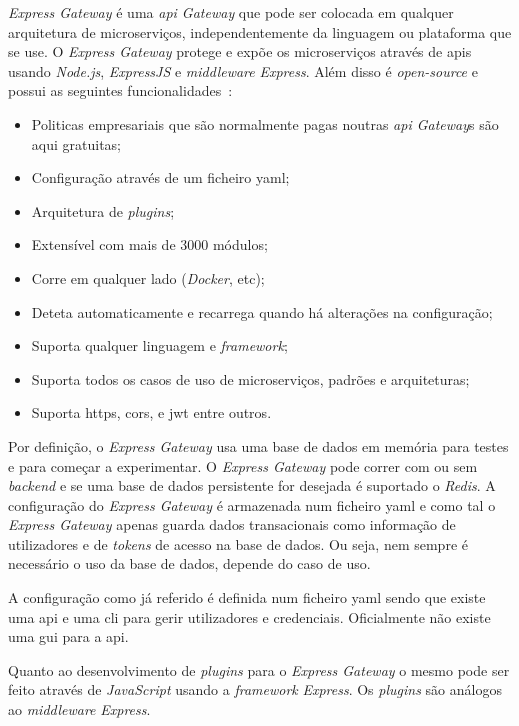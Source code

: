 \textit{Express Gateway} é uma \textit{\acrshort{api} Gateway} que pode ser colocada em qualquer arquitetura de microserviços, independentemente da linguagem ou plataforma que se use. O \textit{Express Gateway} protege e expõe os microserviços através de \acrshort{api}s usando \textit{Node.js}, \textit{ExpressJS} e \textit{middleware} \textit{Express}. Além disso é \textit{open-source} e possui as seguintes funcionalidades~\cite{kong}:
\begin{itemize}
    \item Politicas empresariais que são normalmente pagas noutras \textit{\acrshort{api} Gateway}s são aqui gratuitas;
    \item Configuração através de um ficheiro \acrshort{yaml};
    \item Arquitetura de \textit{plugins};
    \item Extensível com mais de 3000 módulos;
    \item Corre em qualquer lado (\textit{Docker}, etc);
    \item Deteta automaticamente e recarrega quando há alterações na configuração;
    \item Suporta qualquer linguagem e \textit{framework};
    \item Suporta todos os casos de uso de microserviços, padrões e arquiteturas;
    \item Suporta \acrshort{https}, \acrshort{cors}, e \acrshort{jwt} entre outros.
\end{itemize}

Por definição, o \textit{Express Gateway} usa uma base de dados em memória para testes e para começar a experimentar. O \textit{Express Gateway} pode correr com ou sem \textit{backend} e se uma base de dados persistente for desejada é suportado o \textit{Redis}. A configuração do \textit{Express Gateway} é armazenada num ficheiro \acrshort{yaml} e como tal o \textit{Express Gateway} apenas guarda dados transacionais como informação de utilizadores e de \textit{tokens} de acesso na base de dados. Ou seja, nem sempre é necessário o uso da base de dados, depende do caso de uso.

A configuração como já referido é definida num ficheiro \acrshort{yaml} sendo que existe uma \acrshort{api} e uma \acrshort{cli} para gerir utilizadores e credenciais. Oficialmente não existe uma \acrshort{gui} para a \acrshort{api}.

Quanto ao desenvolvimento de \textit{plugins} para o \textit{Express Gateway} o mesmo pode ser feito através de \textit{JavaScript} usando a \textit{framework} \textit{Express}. Os \textit{plugins} são análogos ao \textit{middleware} \textit{Express}. 

